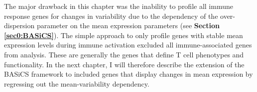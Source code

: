 The major drawback in this chapter was the inability to profile all immune response genes for changes in variability due to the dependency of the over-dispersion parameter on the mean expression parameters (see \textbf{Section \ref{sec0:BASiCS}}). The simple approach to only profile genes with stable mean expression levels during immune activation excluded all immune-associated genes from analysis. These are generally the genes that define T cell phenotypes and functionality. In the next chapter, I will therefore describe the extension of the BASiCS framework to included genes that display changes in mean expression by regressing out the mean-variability dependency.





